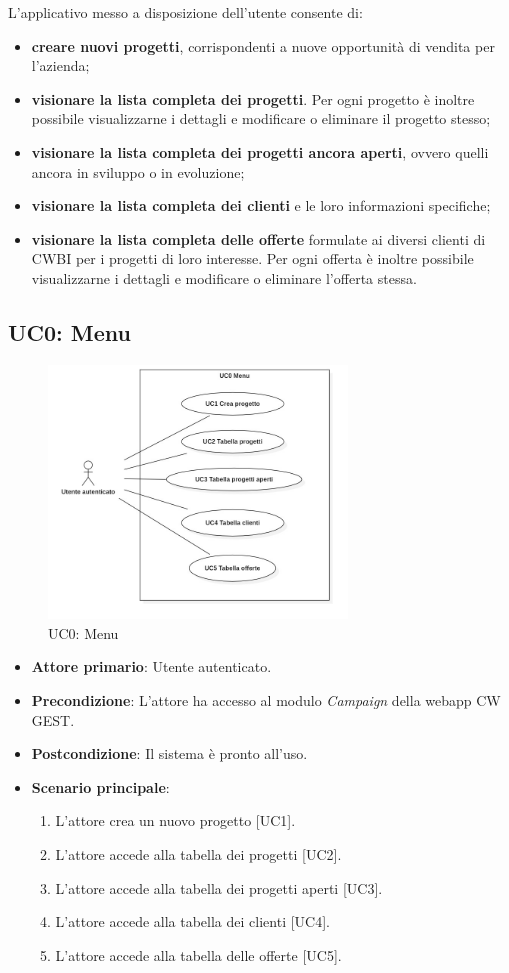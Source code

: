 \noindent L'applicativo messo a disposizione dell'utente consente di:
\begin{itemize}
\item \textbf{creare nuovi progetti}, corrispondenti a nuove opportunità di vendita per l'azienda;
\item \textbf{visionare la lista completa dei progetti}. Per ogni progetto è inoltre possibile visualizzarne i dettagli e modificare o eliminare il progetto stesso;
\item \textbf{visionare la lista completa dei progetti ancora aperti}, ovvero quelli ancora in sviluppo o in evoluzione;
\item \textbf{visionare la lista completa dei clienti} e le loro informazioni specifiche;
\item \textbf{visionare la lista completa delle offerte} formulate ai diversi clienti di CWBI per i progetti di loro interesse. Per ogni offerta è inoltre possibile visualizzarne i dettagli e modificare o eliminare l'offerta stessa.
\end{itemize}  

\subsection{UC0: Menu}
\begin{figure}[!h]
\centering
\includegraphics[width=300px]{../images/UC/.jpeg/UC0-menu.jpg}
\caption{UC0: Menu}
\end{figure}

\begin{itemize}
\item \textbf{Attore primario}: Utente autenticato.
\item \textbf{Precondizione}: L'attore ha accesso al modulo \textit{Campaign} della webapp CW GEST.
\item \textbf{Postcondizione}: Il sistema è pronto all'uso.
\item \textbf{Scenario principale}: 
\begin{enumerate}
\item L'attore crea un nuovo progetto [UC1].
\item L'attore accede alla tabella dei progetti [UC2].
\item L'attore accede alla tabella dei progetti aperti [UC3].
\item L'attore accede alla tabella dei clienti [UC4].
\item L'attore accede alla tabella delle offerte [UC5].
\end{enumerate}
\end{itemize}

